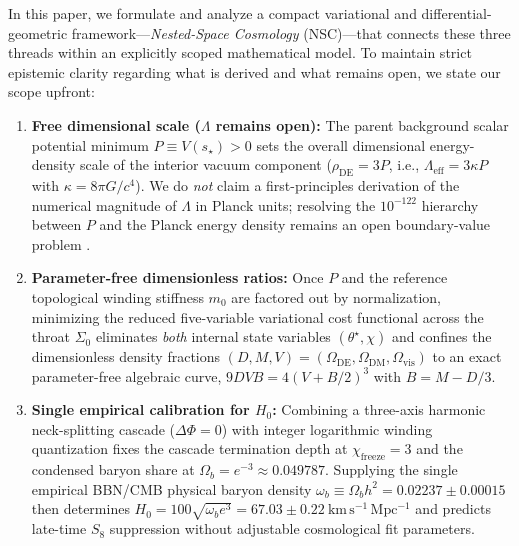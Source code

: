 \documentclass[pdflatex,sn-mathphys-num]{sn-jnl}
\theoremstyle{thmstyleone}
\theoremstyle{thmstyletwo}
\theoremstyle{thmstylethree}
\begin{document}
In this paper, we formulate and analyze a compact variational and differential-geometric framework---\emph{Nested-Space Cosmology} (NSC)---that connects these three threads within an explicitly scoped mathematical model. To maintain strict epistemic clarity regarding what is derived and what remains open, we state our scope upfront:
\begin{enumerate}
\item \textbf{Free dimensional scale ($\Lambda$ remains open):} The parent background scalar potential minimum $P \equiv V(s_\star) > 0$ sets the overall dimensional energy-density scale of the interior vacuum component ($\rho_{\mathrm{DE}} = 3P$, i.e., $\Lambda_{\mathrm{eff}} = 3\kappa P$ with $\kappa = 8\pi G/c^4$). We do \emph{not} claim a first-principles derivation of the numerical magnitude of $\Lambda$ in Planck units; resolving the $10^{-122}$ hierarchy between $P$ and the Planck energy density remains an open boundary-value problem \cite{Weinberg1989}.
\item \textbf{Parameter-free dimensionless ratios:} Once $P$ and the reference topological winding stiffness $m_0$ are factored out by normalization, minimizing the reduced five-variable variational cost functional across the throat $\Sigma_0$ eliminates \emph{both} internal state variables $(\theta^\star, \chi)$ and confines the dimensionless density fractions $(D, M, V) = (\Omega_{\mathrm{DE}}, \Omega_{\mathrm{DM}}, \Omega_{\mathrm{vis}})$ to an exact parameter-free algebraic curve, $9DVB = 4(V + B/2)^3$ with $B = M - D/3$.
\item \textbf{Single empirical calibration for $H_0$:} Combining a three-axis harmonic neck-splitting cascade ($\Delta\Phi = 0$) with integer logarithmic winding quantization fixes the cascade termination depth at $\chi_{\mathrm{freeze}} = 3$ and the condensed baryon share at $\Omega_b = e^{-3} \approx 0.049787$. Supplying the single empirical BBN/CMB physical baryon density $\omega_b \equiv \Omega_b h^2 = 0.02237 \pm 0.00015$ \cite{Planck2018} then determines $H_0 = 100\sqrt{\omega_b e^3} = 67.03 \pm 0.22\ \mathrm{km\,s^{-1}\,Mpc^{-1}}$ and predicts late-time $S_8$ suppression without adjustable cosmological fit parameters.
\end{enumerate}
\end{document}
